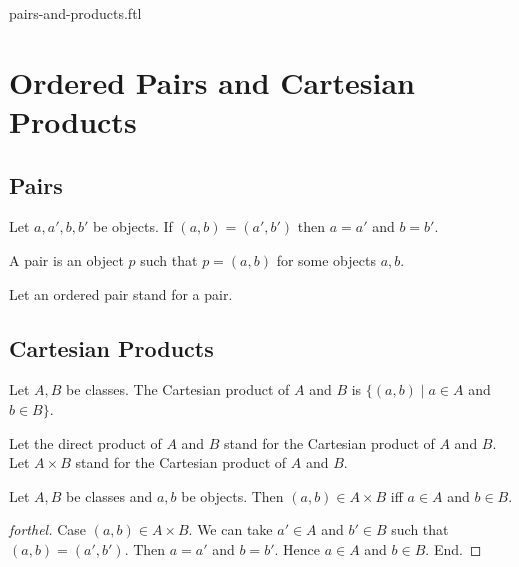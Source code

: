 \documentclass{naproche-library}
\begin{document}
\begin{smodule}{pairs-and-products.ftl}

  \section*{Ordered Pairs and Cartesian Products}

  \subsection*{Pairs}

  \begin{axiom}[forthel,id=FOUNDATIONS_04_8464577431863296,printid]
    Let $a, a', b, b'$ be objects.
    If $(a, b) = (a', b')$ then $a = a'$ and $b = b'$.
  \end{axiom}

  \begin{definition}[forthel,id=FOUNDATIONS_04_4782386822774784,printid]
    A pair is an object $p$ such that $p = (a, b)$ for some objects $a, b$.

    Let an ordered pair stand for a pair.
  \end{definition}


  \subsection*{Cartesian Products}

  \begin{definition}[forthel,id=FOUNDATIONS_04_2877806274936832,printid]
    Let $A, B$ be classes.
    The Cartesian product of $A$ and $B$ is $\{ (a, b) \mid a \in A$ and $b \in B \}$.

    Let the direct product of $A$ and $B$ stand for  the Cartesian product of $A$ and $B$.
    Let $A \times B$ stand for the Cartesian product of $A$ and $B$.
  \end{definition}

  \begin{proposition}[forthel,id=FOUNDATIONS_04_1581118511906816,printid]
    Let $A, B$ be classes and $a, b$ be objects.
    Then $(a, b) \in A \times B$ iff $a \in A$ and $b \in B$.
  \end{proposition}
  \begin{proof}[forthel]
    Case $(a, b) \in A \times B$.
      We can take $a' \in A$ and $b' \in B$ such that $(a, b) = (a', b')$.
      Then $a = a'$ and $b = b'$.
      Hence $a \in A$ and $b \in B$.
    End.


\end{proof}
\end{smodule}
\end{document}
